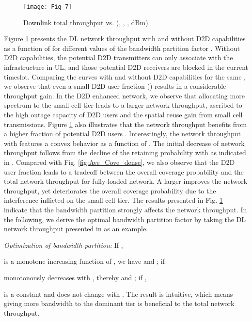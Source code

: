 \documentclass[twocolumn,english]{IEEEtran}
\theoremstyle{plain}
\theoremstyle{definition}
\begin{document}
\begin{figure}[t]
\centering\texttt{[image: Fig\_7]}

\protect\caption{\label{fig:Thrpt_dens}Downlink total throughput vs. 
(, ,
,
 dBm). }
\end{figure}


Figure \ref{fig:Thrpt_dens} presents the DL network throughput with
and without D2D capabilities as a function of 
for different values of the bandwidth partition factor . Without
D2D capabilities, the potential D2D transmitters can only associate
with the infrastructure in UL, and those potential D2D receivers are
blocked in the current timeslot. Comparing the curves with and without
D2D capabilities for the same , we observe that even a small
D2D user fraction () results in a considerable throughput
gain. In the D2D enhanced network, we observe that allocating more
spectrum to the small cell tier leads to a larger network throughput,
ascribed to the high outage capacity of D2D users and the spatial
reuse gain from small cell transmissions. Figure \ref{fig:Thrpt_dens}
also illustrates that the network throughput benefits from a higher
fraction of potential D2D users . Interestingly, the network
throughput with  features a convex behavior as a function
of . The initial decrease of network throughput
follows from the decline of the retaining probability with 
as indicated in . Compared with Fig. \ref{fig:Ave_Cove_dense},
we also observe that the D2D user fraction  leads to a tradeoff
between the overall coverage probability and the total network throughput
for fully-loaded network. A larger  improves the network throughput,
yet deteriorates the overall coverage probability due to the interference
inflicted on the small cell tier. The results presented in Fig. \ref{fig:Thrpt_dens}
indicate that the bandwidth partition strongly affects the network
throughput. In the following, we derive the optimal bandwidth partition
factor  by taking the DL network throughput presented
in  as an example.

\emph{Optimization of bandwidth partition:} If ,

is a monotone increasing function of , we have 
and ;
if 

monotonously decreases with , thereby  and
;
if ,

is a constant and does not change with . The result is intuitive,
which means giving more bandwidth to the dominant tier is beneficial
to the total network throughput.
\end{document}

